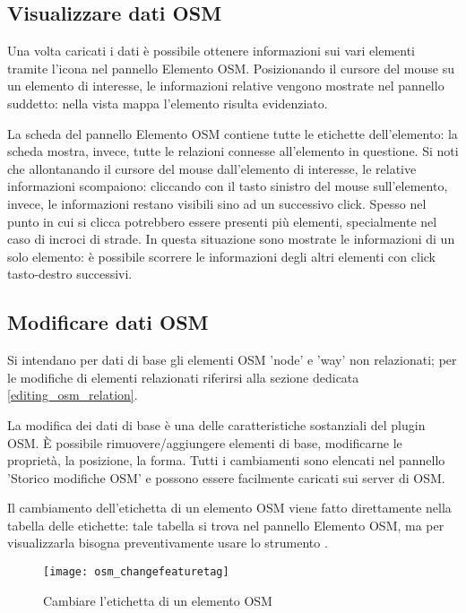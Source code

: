 \subsection{Visualizzare dati OSM}

Una volta caricati i dati è possibile ottenere informazioni sui vari elementi tramite l'icona 
 nel pannello Elemento OSM. 
Posizionando il cursore del mouse su un elemento di interesse, le informazioni relative vengono 
mostrate nel pannello suddetto: nella vista mappa l'elemento risulta evidenziato.

La scheda  del pannello Elemento OSM contiene tutte le etichette dell'elemento: 
la scheda  mostra, invece, tutte le relazioni connesse all'elemento in questione.
Si noti che allontanando il cursore del mouse dall'elemento di interesse, le relative informazioni scompaiono:
cliccando con il tasto sinistro del mouse sull'elemento, invece, le informazioni restano visibili sino 
ad un successivo click. Spesso nel punto in cui si clicca potrebbero essere presenti più elementi, 
specialmente nel caso di incroci di strade. In questa situazione sono mostrate le informazioni di un
solo elemento: è possibile scorrere le informazioni degli altri elementi con click tasto-destro successivi.

\subsection{Modificare dati OSM}

Si intendano per dati di base gli elementi OSM 'node' e 'way' non relazionati; 
per le modifiche di elementi relazionati riferirsi alla sezione dedicata \ref{editing_osm_relation}.

La modifica dei dati di base è una delle caratteristiche sostanziali del plugin OSM. È possibile 
rimuovere/aggiungere elementi di base, modificarne le proprietà, la posizione, la forma. 
Tutti i cambiamenti sono elencati nel pannello 'Storico modifiche OSM' e possono essere 
facilmente caricati sui server di OSM.


Il cambiamento dell'etichetta di un elemento OSM viene fatto direttamente nella tabella delle etichette: 
tale tabella si trova nel pannello Elemento OSM, ma per visualizzarla bisogna preventivamente usare 
lo strumento .

\begin{figure}[ht]
   \centering
   \texttt{[image: osm\_changefeaturetag]}
   \caption{Cambiare l'etichetta di un elemento OSM \wincaption}\label{fig:osmchfeattag}
\end{figure}

